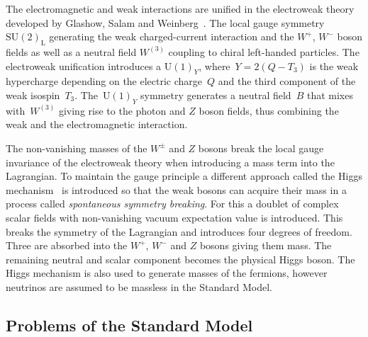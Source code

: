 The electromagnetic and weak interactions are unified in the electroweak theory
developed by Glashow, Salam and Weinberg~\cite{glashow, salam, weinberg}. The
local gauge symmetry~$\mathrm{SU}(2)_\text{L}$ generating the weak
charged-current interaction and the $W^+$, $W^-$ boson fields as well as a
neutral field $W^{(3)}$ coupling to chiral left-handed particles. The
electroweak unification introduces a $\mathrm{U}(1)_Y$, where~$Y = 2 (Q - T_3)$
is the weak hypercharge depending on the electric charge~$Q$ and the third
component of the weak isospin~$T_3$. The~$\mathrm{U}(1)_Y$ symmetry generates a
neutral field~$B$ that mixes with~$W^{(3)}$ giving rise to the photon and $Z$
boson fields, thus combining the weak and the electromagnetic interaction.

The non-vanishing masses of the $W^\pm$ and $Z$ bosons break the local gauge
invariance of the electroweak theory when introducing a mass term into the
Lagrangian. To maintain the gauge principle a different approach called the
Higgs mechanism~\cite{englert_brout, higgs} is introduced so that the weak
bosons can acquire their mass in a process called \emph{spontaneous symmetry
  breaking}. For this a doublet of complex scalar fields with non-vanishing
vacuum expectation value is introduced. This breaks the symmetry of the
Lagrangian and introduces four degrees of freedom. Three are absorbed into the
$W^+$, $W^-$ and $Z$ bosons giving them mass. The remaining neutral and scalar
component becomes the physical Higgs boson. The Higgs mechanism is also used to
generate masses of the fermions, however neutrinos are assumed to be massless in
the Standard Model. 

\subsection{Problems of the Standard Model}

